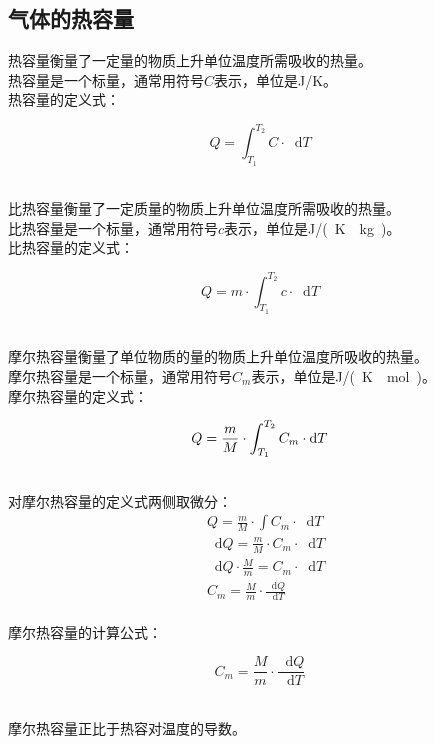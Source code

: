 \documentclass[UTF8]{ctexart}
\newcommand*{\dif}{\mathop{}\!\mathrm{d}}
\begin{document}
\newpage

\subsection{气体的热容量}
    热容量衡量了一定量的物质上升单位温度所需吸收的热量。\\[3mm]
    热容量是一个标量，通常用符号$C$表示，单位是\si{J/K}。\\[3mm]
    热容量的定义式：
    \begin{large}
        \begin{equation*}
            Q=\int_{T_1}^{T_2}C\cdot\dif T
        \end{equation*}
    \end{large}\\
    比热容量衡量了一定质量的物质上升单位温度所需吸收的热量。\\[3mm]
    比热容量是一个标量，通常用符号$c$表示，单位是\si{J/(K\cdot kg)}。\\[3mm]
    比热容量的定义式：
    \begin{large}
        \begin{equation*}
            Q=m\cdot\int_{T_1}^{T_2}c\cdot\dif T
        \end{equation*}
    \end{large}\\
    摩尔热容量衡量了单位物质的量的物质上升单位温度所吸收的热量。\\[3mm]
    摩尔热容量是一个标量，通常用符号$C_m$表示，单位是\si{J/(K\cdot mol)}。\\[3mm]
    摩尔热容量的定义式：
    \begin{large}
        \begin{equation*}
            Q=\frac{m}{M}\cdot\int_{T_1}^{T_2}C_m\cdot\dif T\\[3mm]
        \end{equation*}
    \end{large}\\
    对摩尔热容量的定义式两侧取微分：
    \setcounter{equation}{0}
    \begin{align}
        &Q=\frac{m}{M}\cdot\int C_m\cdot\dif T\\[4mm]
        &\dif Q=\frac{m}{M}\cdot C_m\cdot\dif T\\[4mm]
        &\dif Q\cdot\frac{M}{m}=C_m\cdot\dif T\\[4mm]
        &C_m=\frac{M}{m}\cdot\frac{\dif Q}{\dif T}
    \end{align}\\
    摩尔热容量的计算公式：
    \begin{large}
        \begin{equation*}
            C_m=\frac{M}{m}\cdot\frac{\dif Q}{\dif T}    
        \end{equation*}
    \end{large}\\
    摩尔热容量正比于热容对温度的导数。
\end{document}
